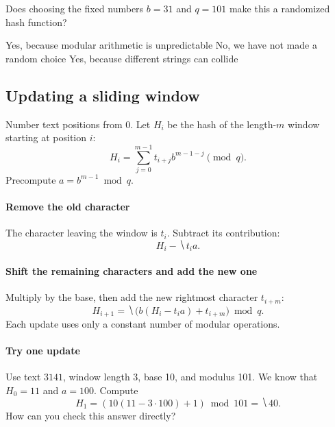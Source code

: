 \documentclass[11pt]{article}
\begin{document}
\begin{Qu}
    Does choosing the fixed numbers $b=31$ and $q=101$ make this a randomized
    hash function?
    \begin{itemize}
        \aitem Yes, because modular arithmetic is unpredictable
        \bitem No, we have not made a random choice
        \citem Yes, because different strings can collide
    \end{itemize}
\end{Qu}

\newpage
\subsection*{Updating a sliding window}
Number text positions from 0. Let $H_i$ be the hash of the length-$m$ window
starting at position $i$:
\begin{equation*}
    H_i=\sum_{j=0}^{m-1}t_{i+j}b^{m-1-j}\pmod q.
\end{equation*}
Precompute $a=b^{m-1}\bmod q$.

\paragraph{Remove the old character}
The character leaving the window is $t_i$. Subtract its contribution:
\begin{equation*}
    H_i-\hide{t_i a}.
\end{equation*}

\paragraph{Shift the remaining characters and add the new one}
Multiply by the base, then add the new rightmost character $t_{i+m}$:
\begin{equation*}
    H_{i+1}=\hide{\bigl(b(H_i-t_i a)+t_{i+m}\bigr)\bmod q}.
\end{equation*}
Each update uses only a constant number of modular operations.

\paragraph{Try one update}
Use text $3141$, window length 3, base 10, and modulus 101. We know that
$H_0=11$ and $a=100$. Compute
\begin{equation*}
    H_1=(10(11-3\cdot100)+1)\bmod101=\hide{40}.
\end{equation*}
How can you check this answer directly?
\vs{.6cm}
\end{document}
